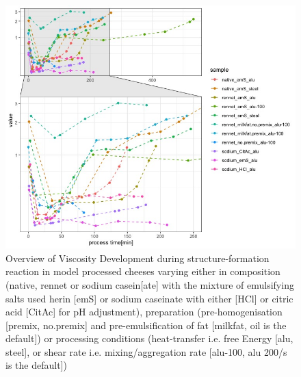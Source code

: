 \documentclass[
]{article}
\begin{document}
\begin{figure}
\includegraphics[width=1\linewidth]{plots/1.1_sum.rheo} \caption[Overview of measured apparent viscosities in samples during model testing]{Overview of Viscosity Development during structure-formation reaction in model processed cheeses varying either in composition (native, rennet or sodium casein[ate] with the mixture of emulsifying salts used herin [emS] or sodium caseinate with either [HCl] or citric acid [CitAc] for pH adjustment), preparation (pre-homogenisation [premix, no.premix] and pre-emulsification of fat [milkfat, oil is the default]) or processing conditions (heat-transfer i.e. free Energy [alu, steel], or shear rate i.e. mixing/aggregation rate [alu-100, alu 200/s is the default])}\label{fig:unnamed-chunk-5}
\end{figure}
\end{document}
